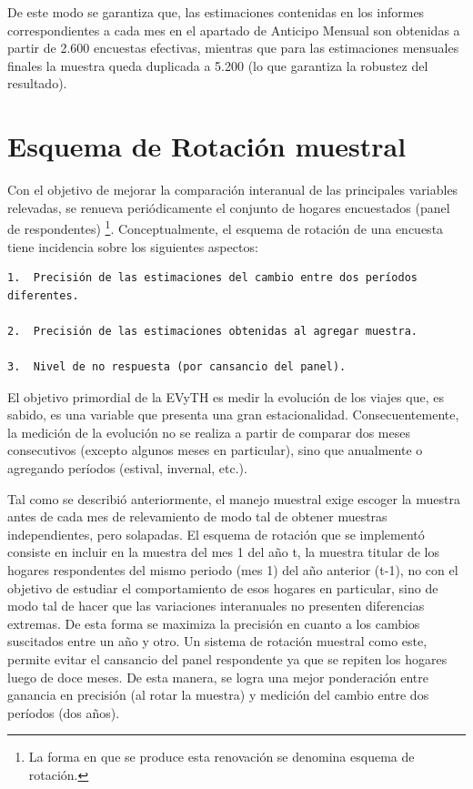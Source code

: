 \documentclass[
  openany]{book}
\begin{document}
De este modo se garantiza que, las estimaciones contenidas en los informes correspondientes a cada mes en el apartado de Anticipo Mensual son obtenidas a partir de 2.600 encuestas efectivas, mientras que para las estimaciones mensuales finales la muestra queda duplicada a 5.200 (lo que garantiza la robustez del resultado).

\hypertarget{esquema-de-rotaciuxf3n-muestral}{%
\section{Esquema de Rotación muestral}\label{esquema-de-rotaciuxf3n-muestral}}

Con el objetivo de mejorar la comparación interanual de las principales variables relevadas, se renueva periódicamente el conjunto de hogares encuestados (panel de respondentes) \footnote{La forma en que se produce esta renovación se denomina esquema de rotación.}. Conceptualmente, el esquema de rotación de una encuesta tiene incidencia sobre los siguientes aspectos:

\begin{verbatim}
1.  Precisión de las estimaciones del cambio entre dos períodos diferentes.

2.  Precisión de las estimaciones obtenidas al agregar muestra.

3.  Nivel de no respuesta (por cansancio del panel).
\end{verbatim}

El objetivo primordial de la EVyTH es medir la evolución de los viajes que, es sabido, es una variable que presenta una gran estacionalidad. Consecuentemente, la medición de la evolución no se realiza a partir de comparar dos meses consecutivos (excepto algunos meses en particular), sino que anualmente o agregando períodos (estival, invernal, etc.).

Tal como se describió anteriormente, el manejo muestral exige escoger la muestra antes de cada mes de relevamiento de modo tal de obtener muestras independientes, pero solapadas. El esquema de rotación que se implementó consiste en incluir en la muestra del mes 1 del año t, la muestra titular de los hogares respondentes del mismo periodo (mes 1) del año anterior (t-1), no con el objetivo de estudiar el comportamiento de esos hogares en particular, sino de modo tal de hacer que las variaciones interanuales no presenten diferencias extremas. De esta forma se maximiza la precisión en cuanto a los cambios suscitados entre un año y otro. Un sistema de rotación muestral como este, permite evitar el cansancio del panel respondente ya que se repiten los hogares luego de doce meses. De esta manera, se logra una mejor ponderación entre ganancia en precisión (al rotar la muestra) y medición del cambio entre dos períodos (dos años).
\end{document}
